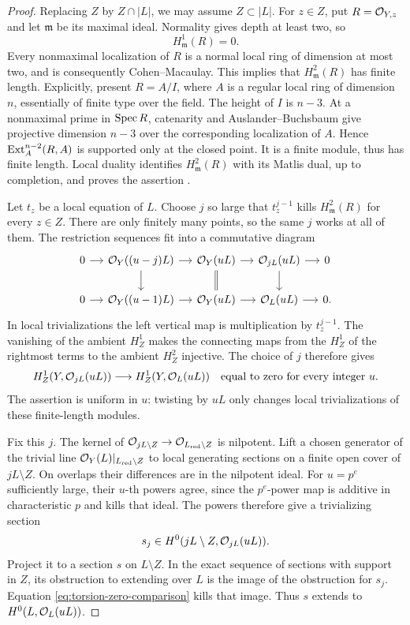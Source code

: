 \begin{proof}
Replacing \(Z\) by \(Z\cap|L|\), we may assume \(Z\subset|L|\).
For \(z\in Z\), put \(R=\mathcal O_{Y,z}\) and let \(\mathfrak m\) be its maximal
ideal.  Normality gives depth at least two, so
\[
 H^1_{\mathfrak m}(R)=0.
\]
Every nonmaximal localization of \(R\) is a normal local ring of dimension
at most two, and is consequently Cohen--Macaulay.
This implies that \(H^2_{\mathfrak m}(R)\) has finite length.
Explicitly, present \(R=A/I\), where \(A\) is a regular local ring of
dimension \(n\), essentially of finite type over the field.
The height of \(I\) is \(n-3\).
At a nonmaximal prime in \(\operatorname{Spec} R\), catenarity and
Auslander--Buchsbaum give projective dimension \(n-3\) over the
corresponding localization of \(A\).  Hence
\(\operatorname{Ext}_A^{n-2}(R,A)\) is supported only at the closed point.
It is a finite module, thus has finite length.
Local duality identifies \(H^2_{\mathfrak m}(R)\) with its Matlis dual,
up to completion, and proves the assertion
\cite{hartshorne1967}.

Let \(t_z\) be a local equation of \(L\).  Choose \(j\) so large that
\(t_z^{j-1}\) kills \(H^2_{\mathfrak m}(R)\) for every \(z\in Z\).
There are only finitely many points, so the same \(j\) works at all of
them.  The restriction sequences fit into a commutative diagram
\[
\begin{tikzcd}[column sep=small]
0 \arrow[r] &
\cO_Y((u-j)L) \arrow[r] \arrow[d] &
\cO_Y(uL) \arrow[r] \arrow[d,equal] &
\cO_{jL}(uL) \arrow[r] \arrow[d] & 0\\
0 \arrow[r] &
\cO_Y((u-1)L) \arrow[r] &
\cO_Y(uL) \arrow[r] &
\cO_L(uL) \arrow[r] & 0 .
\end{tikzcd}
\]
In local trivializations the left vertical map is multiplication by
\(t_z^{j-1}\).
The vanishing of the ambient \(H^1_Z\) makes the connecting maps from
the \(H^1_Z\) of the rightmost terms to the ambient \(H^2_Z\) injective.
The choice of \(j\) therefore gives
\begin{equation}
\label{eq:torsion-zero-comparison}
 H^1_Z(Y,\mathcal O_{jL}(uL))
       \longrightarrow H^1_Z(Y,\mathcal O_L(uL))
 \quad\text{equal to zero for every integer }u .
\end{equation}
The assertion is uniform in \(u\): twisting by \(uL\) only changes local
trivializations of these finite-length modules.

Fix this \(j\).
The kernel of
\(\mathcal O_{jL\setminus Z}\to\mathcal O_{L_{\mathrm{red}}\setminus Z}\)
is nilpotent.
Lift a chosen generator of the trivial line
\(\mathcal O_Y(L)|_{L_{\mathrm{red}}\setminus Z}\) to local generating sections
on a finite open cover of \(jL\setminus Z\).
On overlaps their differences are in the nilpotent ideal.
For \(u=p^e\) sufficiently large, their \(u\)-th powers agree, since
the \(p^e\)-power map is additive in characteristic \(p\) and kills that
ideal.  The powers therefore give a trivializing section
\[
 s_j\in H^0(jL\setminus Z,\mathcal O_{jL}(uL)).
\]
Project it to a section \(s\) on \(L\setminus Z\).
In the exact sequence of sections with support in \(Z\), its obstruction
to extending over \(L\) is the image of the obstruction for \(s_j\).
Equation \eqref{eq:torsion-zero-comparison} kills that image.
Thus \(s\) extends to \(H^0(L,\mathcal O_L(uL))\).


\end{proof}

